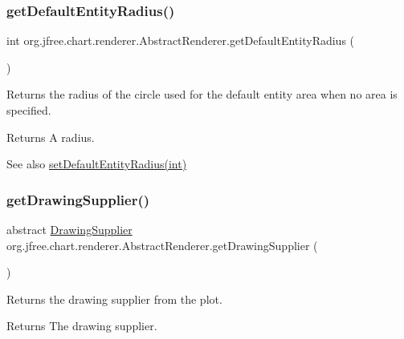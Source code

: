 \subsubsection{\texorpdfstring{get\+Default\+Entity\+Radius()}{getDefaultEntityRadius()}}
{\footnotesize\ttfamily int org.\+jfree.\+chart.\+renderer.\+Abstract\+Renderer.\+get\+Default\+Entity\+Radius (\begin{DoxyParamCaption}{ }\end{DoxyParamCaption})}

Returns the radius of the circle used for the default entity area when no area is specified.

\begin{DoxyReturn}{Returns}
A radius.
\end{DoxyReturn}
\begin{DoxySeeAlso}{See also}
\mbox{\hyperlink{classorg_1_1jfree_1_1chart_1_1renderer_1_1_abstract_renderer_a9624eafc97ea32ccc5685bd6085b5fbf}{set\+Default\+Entity\+Radius(int)}} 
\end{DoxySeeAlso}
\mbox{\label{classorg_1_1jfree_1_1chart_1_1renderer_1_1_abstract_renderer_a9c1b17b997d4a8c8c70a58e4a1c4d237}} 
\subsubsection{\texorpdfstring{get\+Drawing\+Supplier()}{getDrawingSupplier()}}
{\footnotesize\ttfamily abstract \mbox{\hyperlink{interfaceorg_1_1jfree_1_1chart_1_1plot_1_1_drawing_supplier}{Drawing\+Supplier}} org.\+jfree.\+chart.\+renderer.\+Abstract\+Renderer.\+get\+Drawing\+Supplier (\begin{DoxyParamCaption}{ }\end{DoxyParamCaption})\hspace{0.3cm}{\ttfamily [abstract]}}

Returns the drawing supplier from the plot.

\begin{DoxyReturn}{Returns}
The drawing supplier. 
\end{DoxyReturn}
\mbox{\label{classorg_1_1jfree_1_1chart_1_1renderer_1_1_abstract_renderer_ab8e935161d73e01e6435650f056f7307}} 
